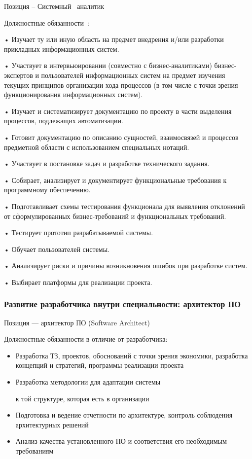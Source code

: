 \documentclass{../industrial-development}
\begin{document}
\lecturenotes

Позиция – Системный~\cite{hh} аналитик~\cite{itcf}

Должностные обязанности~\cite{rab}:

•	Изучает ту или иную область на предмет внедрения и/или разработки прикладных информационных систем. 

•	Участвует в интервьюировании (совместно с бизнес-аналитиками) бизнес-экспертов и пользователей информационных систем на предмет изучения текущих принципов организации хода процессов (в том числе с точки зрения функционирования информационных систем). 

•	Изучает и систематизирует документацию по проекту в части выделения процессов, подлежащих автоматизации. 

•	Готовит документацию по описанию сущностей, взаимосвязей и процессов предметной области с использованием специальных нотаций. 

•	Участвует в постановке задач и разработке технического задания. 

•	Собирает, анализирует и документирует функциональные требования к программному обеспечению. 

•	Подготавливает схемы тестирования функционала для выявления отклонений от сформулированных бизнес-требований и функциональных требований. 

•	Тестирует прототип разрабатываемой системы. 

•	 Обучает пользователей системы. 

•	Анализирует риски и причины возникновения ошибок при разработке систем. 

•	Выбирает платформы для реализации проекта. 

\begin{frame} \frametitle{Развитие разработчика внутри специальности: архитектор ПО}
 \begin{block}{}
  \alert{Позиция --- архитектор ПО (Software Architect)}

Должностные обязанности в отличие от разработчика: 
  \end{block}
  \begin{itemize}
\item  Разработка ТЗ, проектов, обоснований с точки зрения экономики, разработка концепций и стратегий, программы реализации проекта
  \item Разработка методологии для адаптации системы

 к той структуре, которая есть в организации
  \item Подготовка и ведение отчетности по архитектуре, контроль соблюдения архитектурных решений
 \item Анализ качества установленного ПО и соответствия его необходимым требованиям
  \end{itemize}
\end{frame}
\end{document}
